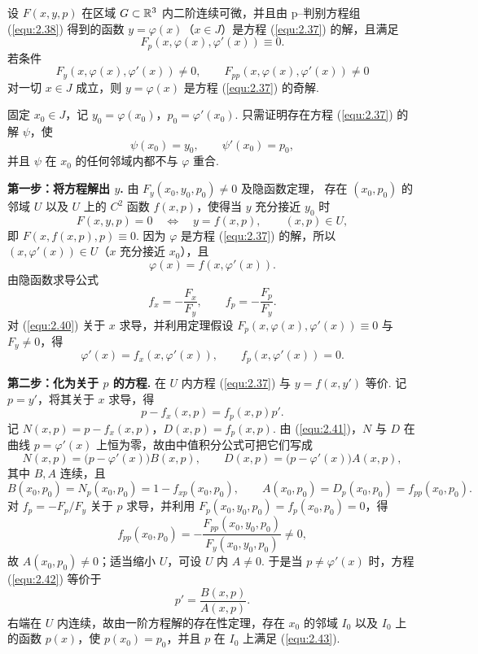 \begin{thm}\label{thm:2.5.4}
设 $F(x,y,p)$ 在区域 $G\subset\mathbb{R}^3$ 内二阶连续可微，并且由 p--判别方程组
(\ref{equ:2.38}) 得到的函数 $y=\varphi(x)$（$x\in J$）是方程 (\ref{equ:2.37})
的解，且满足
\[
F_p(x,\varphi(x),\varphi'(x))\equiv0.
\]
若条件
\begin{equation}\label{equ:2.39}
F_y(x,\varphi(x),\varphi'(x))\neq0,\qquad
F_{pp}(x,\varphi(x),\varphi'(x))\neq0
\end{equation}
对一切 $x\in J$ 成立，则 $y=\varphi(x)$ 是方程 (\ref{equ:2.37}) 的奇解.
\end{thm}
\begin{pf1}
固定 $x_0\in J$，记 $y_0=\varphi(x_0)$，$p_0=\varphi'(x_0)$. 只需证明存在方程
(\ref{equ:2.37}) 的解 $\psi$，使
\[
\psi(x_0)=y_0,\qquad \psi'(x_0)=p_0,
\]
并且 $\psi$ 在 $x_0$ 的任何邻域内都不与 $\varphi$ 重合.

\textbf{第一步：将方程解出 $y$.} 由 $F_y(x_0,y_0,p_0)\neq0$ 及隐函数定理，
存在 $(x_0,p_0)$ 的邻域 $U$ 以及 $U$ 上的 $C^2$ 函数 $f(x,p)$，使得当 $y$
充分接近 $y_0$ 时
\[
F(x,y,p)=0\quad\Longleftrightarrow\quad y=f(x,p),\qquad (x,p)\in U,
\]
即 $F(x,f(x,p),p)\equiv0$. 因为 $\varphi$ 是方程 (\ref{equ:2.37}) 的解，所以
$(x,\varphi'(x))\in U$（$x$ 充分接近 $x_0$），且
\begin{equation}\label{equ:2.40}
\varphi(x)=f(x,\varphi'(x)).
\end{equation}
由隐函数求导公式
\[
f_x=-\frac{F_x}{F_y},\qquad f_p=-\frac{F_p}{F_y}.
\]
对 (\ref{equ:2.40}) 关于 $x$ 求导，并利用定理假设
$F_p(x,\varphi(x),\varphi'(x))\equiv0$ 与 $F_y\neq0$，得
\begin{equation}\label{equ:2.41}
\varphi'(x)=f_x(x,\varphi'(x)),\qquad
f_p(x,\varphi'(x))=0.
\end{equation}

\textbf{第二步：化为关于 $p$ 的方程.} 在 $U$ 内方程 (\ref{equ:2.37}) 与
$y=f(x,y')$ 等价. 记 $p=y'$，将其关于 $x$ 求导，得
\begin{equation}\label{equ:2.42}
p-f_x(x,p)=f_p(x,p)p'.
\end{equation}
记 $N(x,p)=p-f_x(x,p)$，$D(x,p)=f_p(x,p)$. 由 (\ref{equ:2.41})，$N$ 与 $D$
在曲线 $p=\varphi'(x)$ 上恒为零，故由中值积分公式可把它们写成
\[
N(x,p)=\bigl(p-\varphi'(x)\bigr)B(x,p),\qquad
D(x,p)=\bigl(p-\varphi'(x)\bigr)A(x,p),
\]
其中 $B,A$ 连续，且
\[
B(x_0,p_0)=N_p(x_0,p_0)=1-f_{xp}(x_0,p_0),\qquad
A(x_0,p_0)=D_p(x_0,p_0)=f_{pp}(x_0,p_0).
\]
对 $f_p=-F_p/F_y$ 关于 $p$ 求导，并利用
$F_p(x_0,y_0,p_0)=f_p(x_0,p_0)=0$，得
\[
f_{pp}(x_0,p_0)=-\frac{F_{pp}(x_0,y_0,p_0)}{F_y(x_0,y_0,p_0)}\neq0,
\]
故 $A(x_0,p_0)\neq0$；适当缩小 $U$，可设 $U$ 内 $A\neq0$. 于是当
$p\neq\varphi'(x)$ 时，方程 (\ref{equ:2.42}) 等价于
\begin{equation}\label{equ:2.43}
p'=\frac{B(x,p)}{A(x,p)}.
\end{equation}
右端在 $U$ 内连续，故由一阶方程解的存在性定理，存在 $x_0$ 的邻域 $I_0$
以及 $I_0$ 上的函数 $p(x)$，使 $p(x_0)=p_0$，并且 $p$ 在 $I_0$ 上满足
(\ref{equ:2.43}).


\end{pf1}
